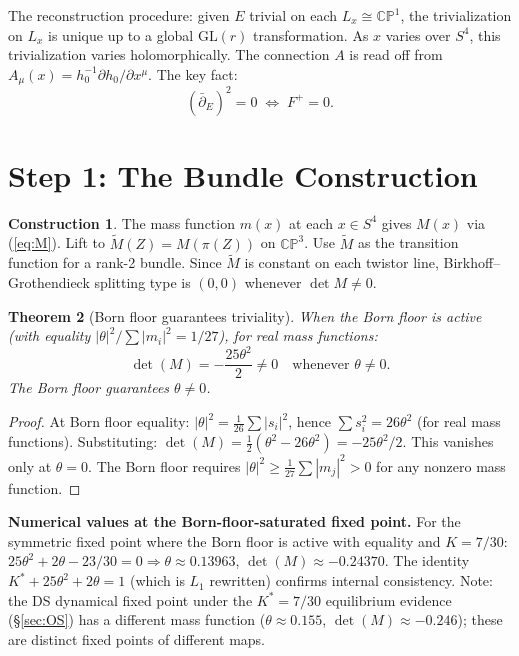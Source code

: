 \documentclass[11pt,a4paper]{article}
\newtheorem{theorem}{Theorem}[section]
\theoremstyle{definition}
\newtheorem{construction}[theorem]{Construction}
\theoremstyle{remark}
\newcommand{\CP}{\mathbb{CP}}
\newcommand{\dbar}{\bar{\partial}}
\newcommand{\GL}{\mathrm{GL}}
\begin{document}
The reconstruction procedure: given $E$ trivial on each $L_x\cong\CP^1$, the trivialization on $L_x$ is unique up to a global $\GL(r)$ transformation. As $x$ varies over $S^4$, this trivialization varies holomorphically. The connection $A$ is read off from $A_\mu(x)=h_0^{-1}\partial h_0/\partial x^\mu$. The key fact:
\begin{equation}
(\dbar_E)^2=0\;\Longleftrightarrow\;F^+=0.
\end{equation}


\section{Step 1: The Bundle Construction}\label{sec:bundle}

\begin{construction}\label{const:bundle}
The mass function $m(x)$ at each $x\in S^4$ gives $M(x)$ via (\ref{eq:M}). Lift to $\tilde{M}(Z)=M(\pi(Z))$ on $\CP^3$. Use $\tilde{M}$ as the transition function for a rank-2 bundle. Since $\tilde{M}$ is constant on each twistor line, Birkhoff--Grothendieck splitting type is $(0,0)$ whenever $\det M\neq 0$.
\end{construction}

\begin{theorem}[Born floor guarantees triviality]\label{thm:trivial}
When the Born floor is active (with equality $|\theta|^2/\sum|m_i|^2=1/27$), for real mass functions:
\begin{equation}
\det(M)=-\frac{25\theta^2}{2}\neq 0\quad\text{whenever }\theta\neq 0.
\end{equation}
The Born floor guarantees $\theta\neq 0$.
\end{theorem}

\begin{proof}
At Born floor equality: $|\theta|^2=\frac{1}{26}\sum|s_i|^2$, hence $\sum s_i^2=26\theta^2$ (for real mass functions). Substituting: $\det(M)=\frac{1}{2}(\theta^2-26\theta^2)=-25\theta^2/2$. This vanishes only at $\theta=0$. The Born floor requires $|\theta|^2\geq\frac{1}{27}\sum|m_j|^2>0$ for any nonzero mass function.
\end{proof}

\textbf{Numerical values at the Born-floor-saturated fixed point.} For the symmetric fixed point where the Born floor is active with equality and $K=7/30$: $25\theta^2+2\theta-23/30=0\Rightarrow\theta\approx 0.13963$, $\det(M)\approx -0.24370$. The identity $K^*+25\theta^2+2\theta=1$ (which is $L_1$ rewritten) confirms internal consistency. Note: the DS dynamical fixed point under the $K^*=7/30$ equilibrium evidence (\S\ref{sec:OS}) has a different mass function ($\theta\approx 0.155$, $\det(M)\approx -0.246$); these are distinct fixed points of different maps.
\end{document}
